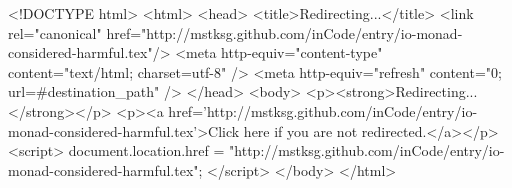 <!DOCTYPE html>
<html>
<head>
<title>Redirecting...</title>
<link rel="canonical" href="http://mstksg.github.com/inCode/entry/io-monad-considered-harmful.tex"/>
<meta http-equiv="content-type" content="text/html; charset=utf-8" />
<meta http-equiv="refresh" content="0; url=#{destination_path}" />
</head>
<body>
  <p><strong>Redirecting...</strong></p>
  <p><a href='http://mstksg.github.com/inCode/entry/io-monad-considered-harmful.tex'>Click here if you are not redirected.</a></p>
  <script>
    document.location.href = "http://mstksg.github.com/inCode/entry/io-monad-considered-harmful.tex";
  </script>
</body>
</html>
